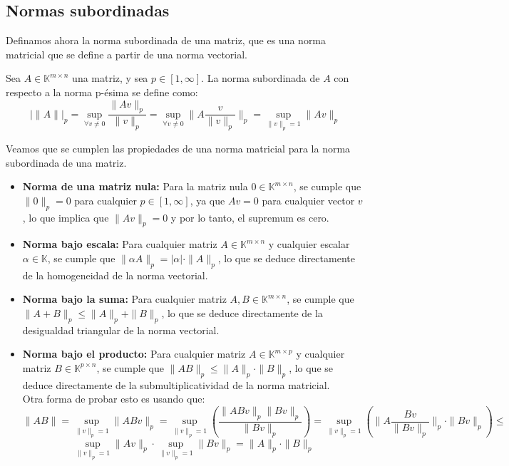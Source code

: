 \subsection{Normas subordinadas}

Definamos ahora la norma subordinada de una matriz, que es una norma matricial que se define a partir de una norma vectorial.

\begin{definición}
    Sea $A \in \mathbb{K}^{m \times n}$ una matriz, y sea $p \in [1, \infty]$. La norma subordinada de $A$ con respecto a la norma p-ésima se define como:
    \[
        | \|A\| |_p =
        \sup_{\forall v \neq 0} \frac{\|Av\|_p}{\|v\|_p} =
        \sup_{\forall v \neq 0} \| A \frac{v}{\|v\|_p} \|_p =
        \sup_{\|v\|_p = 1} \|Av\|_p
    \]
\end{definición}

Veamos que se cumplen las propiedades de una norma matricial para la norma subordinada de una matriz.

\begin{itemize}
    \item \textbf{Norma de una matriz nula:} Para la matriz nula $ 0 \in \mathbb{K}^{m \times n} $, se cumple que $ \|0\|_p = 0 $ para cualquier $ p \in [1, \infty] $, ya que $ Av = 0 $ para cualquier vector $ v $, lo que implica que $ \|Av\|_p = 0 $ y por lo tanto, el supremum es cero.
    \item \textbf{Norma bajo escala:} Para cualquier matriz $ A \in \mathbb{K}^{m \times n} $ y cualquier escalar $ \alpha \in \mathbb{K} $, se cumple que $ \|\alpha A\|_p = |\alpha| \cdot \|A\|_p $, lo que se deduce directamente de la homogeneidad de la norma vectorial.
    \item \textbf{Norma bajo la suma:} Para cualquier matriz $ A, B \in \mathbb{K}^{m \times n} $, se cumple que $ \|A + B\|_p \leq \|A\|_p + \|B\|_p $, lo que se deduce directamente de la desigualdad triangular de la norma vectorial.
    \item \textbf{Norma bajo el producto:} Para cualquier matriz $ A \in \mathbb{K}^{m \times p} $ y cualquier matriz $ B \in \mathbb{K}^{p \times n} $, se cumple que $ \|AB\|_p \leq \|A\|_p \cdot \|B\|_p $, lo que se deduce directamente de la submultiplicatividad de la norma matricial.\\
    Otra forma de probar esto es usando que:
    \[
        \| AB \| =
        \sup_{\|v\|_p = 1} \| AB v \|_p =
        \sup_{\|v\|_p = 1} \left( \frac{\| AB v \|_p \| B v\|_p}{\|B v\|_p} \right) =
        \sup_{\|v\|_p = 1} \left( \| A \frac{B v}{\|B v\|_p} \|_p \cdot \| B v\|_p \right) \leq
    \]
    \[
        \sup_{\|v\|_p = 1} \| Av \|_p \cdot \sup_{\|v\|_p = 1} \| B v\|_p =
        \|A\|_p \cdot \|B\|_p
    \]
\end{itemize}

